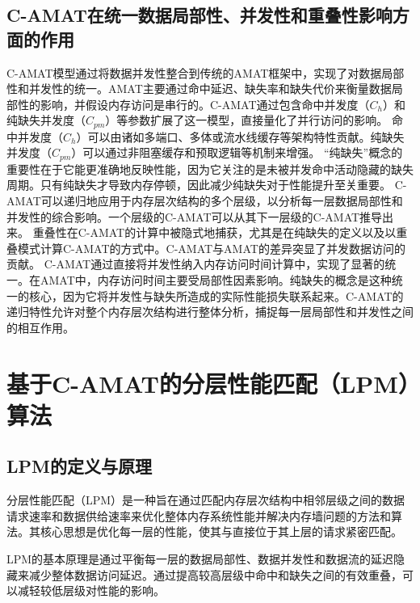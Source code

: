 \documentclass[UTF8]{ctexart}
\begin{document}
\subsection{C-AMAT在统一数据局部性、并发性和重叠性影响方面的作用}
C-AMAT模型通过将数据并发性整合到传统的AMAT框架中，实现了对数据局部性和并发性的统一\cite{illustrationCAMATPureMiss}。AMAT主要通过命中延迟、缺失率和缺失代价来衡量数据局部性的影响，并假设内存访问是串行的\cite{wikiAMAT}。C-AMAT通过包含命中并发度（$C_h$）和纯缺失并发度（$C_{pm}$）等参数扩展了这一模型，直接量化了并行访问的影响\cite{sunCAMATPage}。
命中并发度（$C_h$）可以由诸如多端口、多体或流水线缓存等架构特性贡献\cite{sun2018optimizing}。纯缺失并发度（$C_{pm}$）可以通过非阻塞缓存和预取逻辑等机制来增强\cite{illustrationCAMATPureMiss}。
“纯缺失”概念的重要性在于它能更准确地反映性能，因为它关注的是未被并发命中活动隐藏的缺失周期\cite{illustrationCAMATPureMiss}。只有纯缺失才导致内存停顿，因此减少纯缺失对于性能提升至关重要\cite{sunCAMATPage}。
C-AMAT可以递归地应用于内存层次结构的多个层级，以分析每一层数据局部性和并发性的综合影响\cite{sunCAMATPage}。一个层级的C-AMAT可以从其下一层级的C-AMAT推导出来\cite{sun2018optimizing}。
重叠性在C-AMAT的计算中被隐式地捕获，尤其是在纯缺失的定义以及以重叠模式计算C-AMAT的方式中\cite{sunCAMATPage}。C-AMAT与AMAT的差异突显了并发数据访问的贡献\cite{liu2024lpm}。
C-AMAT通过直接将并发性纳入内存访问时间计算中，实现了显著的统一。在AMAT中，内存访问时间主要受局部性因素影响。纯缺失的概念是这种统一的核心，因为它将并发性与缺失所造成的实际性能损失联系起来。C-AMAT的递归特性允许对整个内存层次结构进行整体分析，捕捉每一层局部性和并发性之间的相互作用。

\section{基于C-AMAT的分层性能匹配（LPM）算法}

\subsection{LPM的定义与原理}
分层性能匹配（LPM）是一种旨在通过匹配内存层次结构中相邻层级之间的数据请求速率和数据供给速率来优化整体内存系统性能并解决内存墙问题的方法和算法\cite{sun2018optimizing}。其核心思想是优化每一层的性能，使其与直接位于其上层的请求紧密匹配\cite{liu2024lpm}。

LPM的基本原理是通过平衡每一层的数据局部性、数据并发性和数据流的延迟隐藏来减少整体数据访问延迟\cite{liu2024lpm}。通过提高较高层级中命中和缺失之间的有效重叠，可以减轻较低层级对性能的影响\cite{liu2024lpm}。
\end{document}
